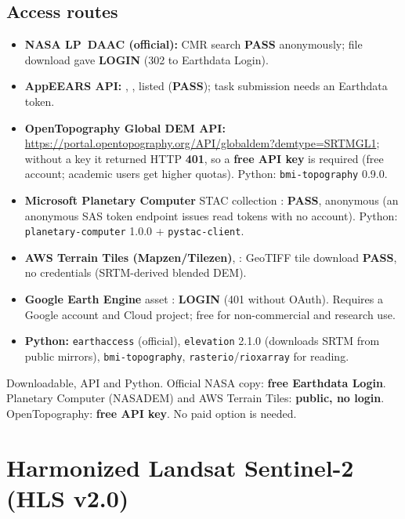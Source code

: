 \documentclass[10pt,a4paper]{article}
\newcommand{\OK}{\textcolor{ok}{\textbf{PASS}}}
\newcommand{\AUTH}{\textcolor{mid}{\textbf{LOGIN}}}
\begin{document}
\subsection{Access routes}
\begin{itemize}
\item \textbf{NASA LP~DAAC (official):} CMR search \OK{} anonymously; file download  gave \AUTH{} (302 to Earthdata Login).
\item \textbf{AppEEARS API:} , ,  listed (\OK{}); task submission needs an Earthdata token.
\item \textbf{OpenTopography Global DEM API:} \url{https://portal.opentopography.org/API/globaldem?demtype=SRTMGL1}; without a key it returned HTTP \textbf{401}, so a \textbf{free API key} is required (free account; academic users get higher quotas). Python: \texttt{bmi-topography} 0.9.0.
\item \textbf{Microsoft Planetary Computer} STAC collection : \OK{}, anonymous (an anonymous SAS token endpoint issues read tokens with no account). Python: \texttt{planetary-computer} 1.0.0 + \texttt{pystac-client}.
\item \textbf{AWS Terrain Tiles (Mapzen/Tilezen)}, : GeoTIFF tile download \OK{}, no credentials (SRTM-derived blended DEM).
\item \textbf{Google Earth Engine} asset : \AUTH{} (401 without OAuth). Requires a Google account and Cloud project; free for non-commercial and research use.
\item \textbf{Python:} \texttt{earthaccess} (official), \texttt{elevation} 2.1.0 (downloads SRTM from public mirrors), \texttt{bmi-topography}, \texttt{rasterio}/\texttt{rioxarray} for reading.
\end{itemize}
\begin{verdict}
Downloadable, API and Python. Official NASA copy: \textbf{free Earthdata Login}. Planetary Computer (NASADEM) and AWS Terrain Tiles: \textbf{public, no login}. OpenTopography: \textbf{free API key}. No paid option is needed.
\end{verdict}

\section{Harmonized Landsat Sentinel-2 (HLS v2.0)}
\end{document}
